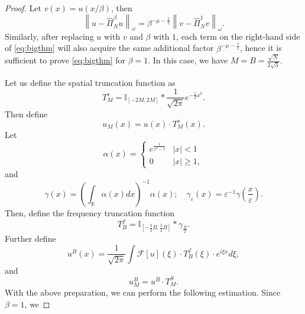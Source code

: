 \documentclass[pdflatex,sn-aps]{sn-jnl}%
\theoremstyle{thmstyleone}%
\theoremstyle{thmstyletwo}%
\theoremstyle{thmstylethree}%
\begin{document}
\begin{proof}
  Let $v(x) = u(x/\beta)$, then
  \begin{equation}\label{eq:0505-2}
    \left\|u-\widehat{\Pi}_N^\beta u\right\|_\omega=\beta^{-\mu-\frac{1}{2}}\left\|v-\widehat{\Pi}_N^1 v\right\|_\omega.
  \end{equation}
  Similarly, after replacing $u$ with $v$ and $\beta$ with $1$, 
  each term on the right-hand side of \eqref{eq:bigthm} 
  will also acquire the same additional factor $\beta^{-\mu-\frac{1}{2}}$,
  hence it is sufficient to prove \eqref{eq:bigthm} for $\beta = 1$.
  In this case, we have $M = B = \frac{\sqrt{N}}{2\sqrt{3}}$.

  Let us define the spatial truncation function as
  \begin{equation}\label{eq:0505-3}
    T_M^s=\mathbb{I}_{[-2 M, 2 M]} * \frac{1}{\sqrt{2 \pi}} e^{-\frac{1}{2} x^2}.
  \end{equation}
  Then define
  \begin{equation}\label{eq:0505-3.5}
    u_M(x) = u(x) \cdot T_M^s(x).
  \end{equation}
  Let
  \begin{equation}\label{eq:0505-4}
    \alpha(x)=\left\{\begin{array}{cc}
    e^{\frac{1}{x^2-1}} & |x|<1 \\
    0 & |x| \geqslant 1,
    \end{array}\right.
  \end{equation}
  and
  \begin{equation}\label{eq:0505-5}
    \gamma(x)=\left(\int_\mathbb{R} \alpha(x) d x\right)^{-1} \alpha(x) ; \quad \gamma_{\varepsilon}(x)=\varepsilon^{-1} \gamma\left(\frac{x}{\varepsilon}\right).
  \end{equation}
  Then, define the frequency truncation function
  \begin{equation}\label{eq:0505-6}
    T_B^f=\mathbb{I}_{\left[-\frac{3}{2} B, \frac{3}{2} B\right]} * \gamma_{\frac{B}{2}}.
  \end{equation}
  Further define
  \begin{equation}\label{eq:0505-7}
    u^B(x)=\frac{1}{\sqrt{2 \pi}} \int \mathcal{F}[u](\xi) \cdot T_B^f(\xi) \cdot e^{i \xi x} d \xi,  
  \end{equation}
  and
  \begin{equation}
  u_M^B=u^B \cdot T_M^S.
  \end{equation}
  With the above preparation, we can perform the following estimation. Since $\beta = 1$, we

\end{proof}
\end{document}

